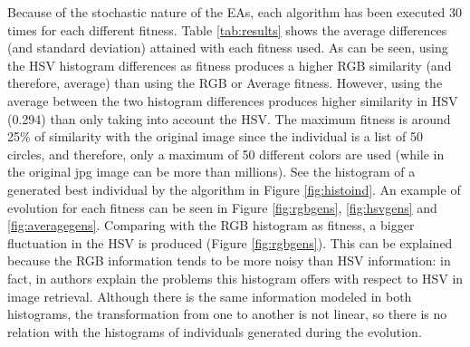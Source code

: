 \noindent Because of the stochastic nature of the EAs, each algorithm has been executed 30 times for each different fitness. Table \ref{tab:results} shows the average differences (and standard deviation) attained with each fitness used. As can be seen, using the HSV histogram differences as fitness produces a higher RGB similarity (and therefore, average) than using the RGB or Average fitness. However, using the average between the two histogram differences produces higher similarity in HSV (0.294) than only taking into account the HSV. The maximum fitness is around 25\% of similarity with the original image since the individual is a list of 50 circles, and therefore, only a maximum of 50 different colors are used (while in the original jpg image can be more than millions). See the histogram of a generated best individual by the algorithm in Figure \ref{fig:histoind}. An example of evolution for each fitness can be seen in Figure \ref{fig:rgbgens}, \ref{fig:hsvgens} and \ref{fig:averagegens}. Comparing with the RGB histogram as fitness, a bigger fluctuation in the HSV is produced (Figure \ref{fig:rgbgens}). This can be explained because the RGB information tends to be more noisy than HSV information: in fact, in \cite{COLORDIFFERENCES} authors explain the problems this histogram offers with respect to HSV in image retrieval. Although there is the same information modeled in both histograms, the transformation from one to another is not linear, so there is no relation with the histograms of individuals generated during the evolution.

\begin{table}
\caption{Results for the different fitness (average of the 30 executions and standard deviation). Only one histogram type is used for fitness calculation, but the other values obtained are also added.}
\label{tab:results}
\end{table}

